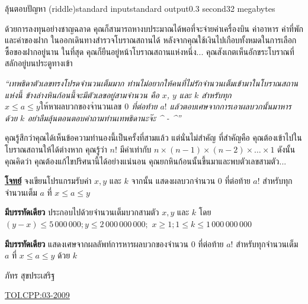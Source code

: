 \documentclass[11pt,a4paper]{article}
\begin{document}
\begin{problem}{ลุ้นตอบปัญหา (riddle)}{standard input}{standard output}{0.3 second}{32 megabytes}

 ด้วยการลงทุนอย่างชาญฉลาด คุณก็สามารถหางบประมาณได้พอที่จะจ่ายค่าเครื่องบิน ค่าอาหาร ค่าที่พัก และค่าของฝาก ในออกเดินทางสำรวจโบราณสถานได้ หลังจากคุณใช้เงินไปเกือบทั้งหมดในการเลือกซื้อของฝากอยู่นาน ในที่สุด คุณก็ยืนอยู่หน้าโบราณสถานแห่งหนึ่ง... คุณสังเกตเห็นอักขระโบราณที่สลักอยู่บนประตูทางเข้า

\begin{center}
        \textit{“เทพธิดาตัวเลขทรงโปรดจำนวนเต็มมาก ท่านไม่อยากให้คนที่ไม่รักจำนวนเต็มเข้ามาในโบราณสถานแห่งนี้ ข้างล่างหินก้อนนี้จะมีตัวเลขอยู่สามจำนวน คือ $x$, $y$ และ $k$ สำหรับทุก $x \leq a \leq y ให้หาผลบวกของจำนวนเลข $ $0$ ที่ต่อท้าย $a!$ แล้วตอบเศษจากการเอาผลบวกนั้นมาหารด้วย $k$ อย่าลืมลุ้นตอนตอบคำถามท่านเทพธิดานะจ๊ะ \^{} - \^{}”}
\end{center}

        คุณรู้สึกว่าคุณได้เห็นข้อความทำนองนี้เป็นครั้งที่สามแล้ว แต่นั่นไม่สำคัญ ที่สำคัญคือ คุณต้องเข้าไปในโบราณสถานให้ได้ต่างหาก คุณรู้ว่า $n!$ มีค่าเท่ากับ $n \times (n-1) \times (n-2) \times … \times 1$ ดังนั้นคุณคิดว่า คุณต้องแก้ไขปริศนานี้ได้อย่างแน่นอน คุณยกหินก้อนนั้นขึ้นมาและพบตัวเลขสามตัว...


\bigskip
\underline{\textbf{โจทย์}}   จงเขียนโปรแกรมรับค่า $x, y$ และ $k$ จากนั้น แสดงผลบวกจำนวน $0$ ที่ต่อท้าย $a!$ สำหรับทุกจำนวนเต็ม $a$ ที่ $x \leq a \leq y$ 

\InputFile

\textbf{มีบรรทัดเดียว} ประกอบไปด้วยจำนวนเต็มบวกสามตัว $x, y$ และ $k$ โดย $(y-x) \leq 5\,000\,000; y \leq 2\,000\,000\,000;$ $x \geq 1; 1 \leq k \leq 1\,000\,000\,000$

\OutputFile

\textbf{มีบรรทัดเดียว} แสดงเศษจากผลลัพท์การหารผลบวกของจำนวน $0$ ที่ต่อท้าย $a!$ สำหรับทุกจำนวนเต็ม $a$ ที่ $x \leq a \leq y$ ด้วย $k$

\Examples

\begin{example}
%
\end{example}


\Source

ภัทร สุขประเสริฐ

\underline{\href{http://www.thailandoi.org/toi.c/03-2009}{TOI.CPP:03-2009}}

\end{problem}
\end{document}
